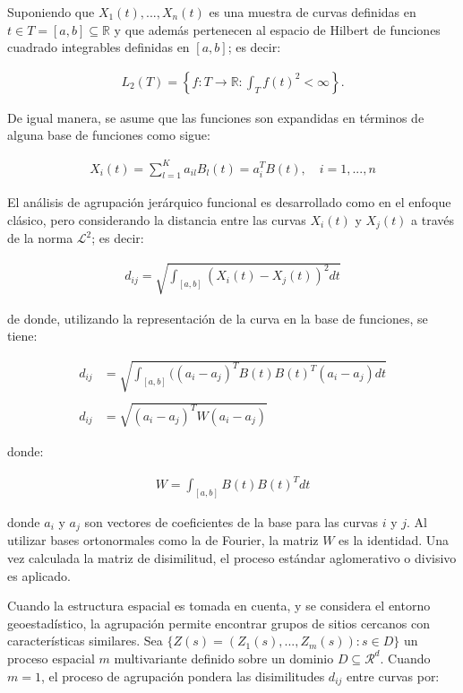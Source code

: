 \documentclass[
]{book}
\begin{document}
Suponiendo que \(X_1(t),...,X_n(t)\) es una muestra de curvas definidas en \(t\in T=[a,b]\subseteq \mathbb{R}\) y que además pertenecen al espacio de Hilbert de funciones cuadrado integrables definidas en \([a,b]\); es decir:

\begin{align*}
    L_2(T)=\left\{f: T\to \mathbb{R}: \int_Tf(t)^2<\infty \right\}.
\end{align*}

De igual manera, se asume que las funciones son expandidas en términos de alguna base de funciones como sigue:

\begin{align*}
    X_i(t)=\sum_{l=1}^Ka_{il}B_l(t)=a_i^TB(t),\quad i=1,...,n
\end{align*}

El análisis de agrupación jerárquico funcional es desarrollado como en el enfoque clásico, pero considerando la distancia entre las curvas \(X_i(t)\) y \(X_j(t)\) a través de la norma \(\mathcal{L}^2\); es decir:

\begin{align*}
    d_{ij}=\sqrt{\int_{[a,b]} (X_{i}(t)-X_{j}(t))^2 dt}
\end{align*}

de donde, utilizando la representación de la curva en la base de funciones, se tiene:

\begin{align*}
    d_{ij}&=\sqrt{\int_{[a,b]} ((a_i - a_j)^T B(t)B(t)^T (a_i - a_j) dt}\\\\
   d_{ij} &=\sqrt{(a_i-a_j)^T W (a_i - a_j)}
\end{align*}

donde:

\begin{align*}
    W=\int_{[a,b]}B(t)B(t)^Tdt
\end{align*}

donde \(a_i\) y \(a_j\) son vectores de coeficientes de la base para las curvas \(i\) y \(j\). Al utilizar bases ortonormales como la de Fourier, la matriz \(W\) es la identidad. Una vez calculada la matriz de disimilitud, el proceso estándar aglomerativo o divisivo es aplicado.

Cuando la estructura espacial es tomada en cuenta, y se considera el entorno geoestadístico, la agrupación permite encontrar grupos de sitios cercanos con características similares. Sea \(\{Z(s)=(Z_1(s),...,Z_m(s)): s\in D\}\) un proceso espacial \(m\) multivariante definido sobre un dominio \(D\subseteq \mathcal{R}^d\). Cuando \(m=1\), el proceso de agrupación pondera las disimilitudes \(d_{ij}\) entre curvas por:
\end{document}
